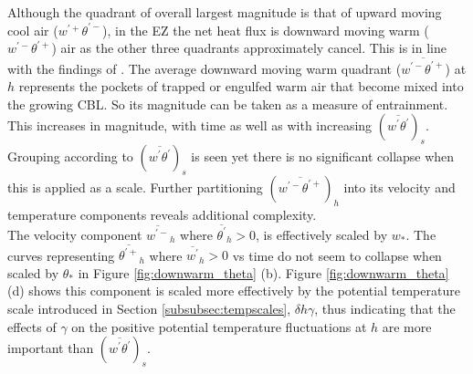 Although the quadrant of overall largest magnitude is that of upward moving cool air ($w^{'+}\theta^{'-}$), in the EZ the net heat flux is downward moving warm ($w^{'-}\theta^{'+}$) air as the other three quadrants approximately cancel.  This is in line with the findings of \cite{SullMoengStev}.  The average downward moving warm quadrant ($\overline{w^{'-}\theta^{'+}}$) at $h$ represents the pockets of trapped or engulfed warm air that become mixed into the growing CBL.  So its magnitude can be taken as a measure of entrainment.  This increases in magnitude, with time as well as with increasing $(\overline{w^{'}\theta^{'}})_{s}$.  Grouping according to $(\overline{w^{'}\theta^{'}})_{s}$ is seen yet there is no significant collapse when this is applied as a scale.  Further partitioning $(\overline{w^{'-}\theta^{'+}})_{h}$ into its velocity and temperature components reveals additional complexity.\\

The velocity component $\overline{w^{'-}}_{h}$  where $ \overline{\theta^{'}}_{h}>0$, is effectively scaled by $w_{*}$.  The curves representing $\overline{\theta^{'+}}_{h}$ where $\overline{w^{'}}_{h}>0$ vs time do not seem to collapse when scaled by $\theta_{*}$ in Figure \ref{fig:downwarm_theta} (b).  Figure \ref{fig:downwarm_theta} (d) shows this component is scaled more effectively by the potential temperature scale introduced in Section \ref{subsubsec:tempscales}, $\delta h \gamma$, thus indicating that the effects of $\gamma$ on the positive potential temperature fluctuations at $h$ are more important than $(\overline{w^{'}\theta^{'}})_{s}$.\\ 
\\   

